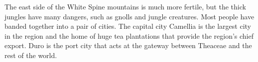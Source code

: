 The east side of the White Spine mountains is much more fertile, but the thick jungles have many dangers, such as gnolls and jungle creatures.
Most people have banded together into a pair of cities.
The capital city Camellia is the largest city in the region and the home of huge tea plantations that provide the region's chief export.
Duro is the port city that acts at the gateway between Theaceae and the rest of the world.
